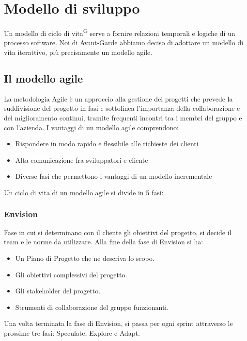 \newpage
\section{Modello di sviluppo}\label{sec:modello_sviluppo}
Un modello di ciclo di vita\textsuperscript{G} serve a fornire relazioni temporali e logiche di un processo software.
Noi di Avant-Garde abbiamo deciso di adottare un modello di vita iterattivo, più precisamente un modello agile.

\subsection{Il modello agile}\label{sec:modello_sviluppo:agile}
La metodologia Agile è un approccio alla gestione dei progetti che prevede la suddivisione del progetto in fasi e sottolinea l'importanza della collaborazione e del miglioramento continui, tramite frequenti incontri tra i membri del gruppo e con l'azienda.
I vantaggi di un modello agile comprendono:
\begin{itemize}
    \item Rispondere in modo rapido e flessibile alle richieste dei clienti
    \item Alta comunicazione fra sviluppatori e cliente
    \item Diverse fasi che permettono i vantaggi di un modello incrementale
\end{itemize}
Un ciclo di vita di un modello agile si divide in 5 fasi:
    \subsubsection{Envision}\label{sec:modello_sviluppo:agile:envision}
    Fase in cui si determinano con il cliente gli obiettivi del progetto, si decide il team e le norme da utilizzare.
    Alla fine della fase di Envision si ha:
    \begin{itemize}
        \item Un Piano di Progetto che ne descriva lo scopo.
        \item Gli obiettivi complessivi del progetto.
        \item Gli stakeholder del progetto.
        \item Strumenti di collaborazione del gruppo funzionanti.
    \end{itemize}
    Una volta terminata la fase di Envision, si passa per ogni sprint attraverso le prossime tre fasi: Speculate, Explore e Adapt.
